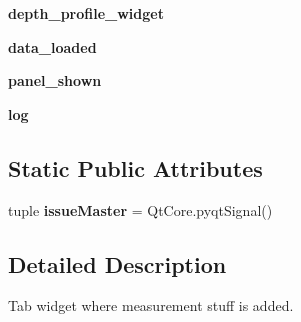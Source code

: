 \begin{DoxyCompactItemize}
\item 
\hypertarget{classWidgets_1_1MeasurementTabWidget_1_1MeasurementTabWidget_ab9b27989a0ca97792a551aff950abd27}{{\bfseries depth\-\_\-profile\-\_\-widget}}\label{classWidgets_1_1MeasurementTabWidget_1_1MeasurementTabWidget_ab9b27989a0ca97792a551aff950abd27}

\item 
\hypertarget{classWidgets_1_1MeasurementTabWidget_1_1MeasurementTabWidget_a972d604db691d5df0e926c7d73e8627a}{{\bfseries data\-\_\-loaded}}\label{classWidgets_1_1MeasurementTabWidget_1_1MeasurementTabWidget_a972d604db691d5df0e926c7d73e8627a}

\item 
\hypertarget{classWidgets_1_1MeasurementTabWidget_1_1MeasurementTabWidget_abac09b9a5299b26137cdf82c3b2428aa}{{\bfseries panel\-\_\-shown}}\label{classWidgets_1_1MeasurementTabWidget_1_1MeasurementTabWidget_abac09b9a5299b26137cdf82c3b2428aa}

\item 
\hypertarget{classWidgets_1_1MeasurementTabWidget_1_1MeasurementTabWidget_a442ad52314a8ef4a886f838909eac71b}{{\bfseries log}}\label{classWidgets_1_1MeasurementTabWidget_1_1MeasurementTabWidget_a442ad52314a8ef4a886f838909eac71b}

\end{DoxyCompactItemize}
\subsection*{Static Public Attributes}
\begin{DoxyCompactItemize}
\item 
\hypertarget{classWidgets_1_1MeasurementTabWidget_1_1MeasurementTabWidget_aab78674401a0a766e823abbb6d208cbd}{tuple {\bfseries issue\-Master} = Qt\-Core.\-pyqt\-Signal()}\label{classWidgets_1_1MeasurementTabWidget_1_1MeasurementTabWidget_aab78674401a0a766e823abbb6d208cbd}

\end{DoxyCompactItemize}


\subsection{Detailed Description}
\begin{DoxyVerb}Tab widget where measurement stuff is added.
\end{DoxyVerb}
 

